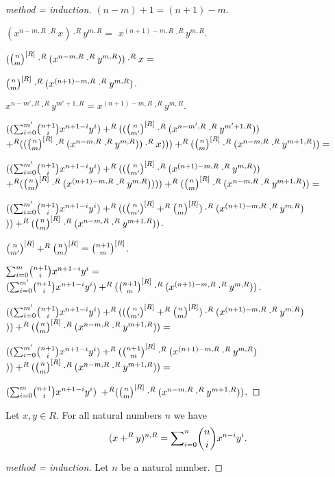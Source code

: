 \documentclass[11pt]{article}
\begin{document}
\begin{forthel}
\begin{proof}[method = induction]
$(n - m) + 1 = (n + 1) - m$.

$(x^{n - m,R} \cdot^{R} x) \cdot^{R} y^{m,R} =$
$x^{(n+1)-m,R} \cdot^{R} y^{m,R}$.

$(\cho{n}{m}^{[R]} \cdot^{R} (x^{n - m,R} \cdot^{R} y^{m,R})) \cdot^{R} x = $

$\cho{n}{m}^{[R]} \cdot^{R} (x^{(n+1) - m,R} \cdot^{R} y^{m,R})$.

$x^{n-m',R} \cdot^{R} y^{m'+1,R} = x^{(n+1)-m,R} \cdot^{R} y^{m,R}.$

$ ((\binsum{m'}{n+1}{x}{y}{R}) +^{R} ((\cho{n}{m'}^{[R]} \cdot^{R} (x^{n-m',R} \cdot^{R} y^{m'+1,R})) $
$ +^{R} 
((\cho{n}{m}^{[R]} \cdot^{R} (x^{n - m,R} \cdot^{R} y^{m,R})) \cdot^{R} x)))
   +^{R} (\cho{n}{m}^{[R]} \cdot^{R} (x^{n - m,R} \cdot^{R} y^{m+1,R})) = $

$ ((\binsum{m'}{n+1}{x}{y}{R}) +^{R} ((\cho{n}{m'}^{[R]} \cdot^{R} (x^{(n+1)-m,R} \cdot^{R} y^{m,R})) $
$ +^{R} 
(\cho{n}{m}^{[R]} \cdot^{R} (x^{(n+1) - m,R} \cdot^{R} y^{m,R}))))
   +^{R} (\cho{n}{m}^{[R]} \cdot^{R} (x^{n - m,R} \cdot^{R} y^{m+1,R})) =$

$ ((\binsum{m'}{n+1}{x}{y}{R}) +^{R} ((\cho{n}{m'}^{[R]} +^{R}  \cho{n}{m}^{[R]} )\cdot^{R} (x^{(n+1)-m,R} \cdot^{R} y^{m,R}) $
$  ))
   +^{R} (\cho{n}{m}^{[R]} \cdot^{R} (x^{n - m,R} \cdot^{R} y^{m+1,R})) $.

$\cho{n}{m'}^{[R]} +^{R}  \cho{n}{m}^{[R]} = \cho{n+1}{m}^{[R]}$.



$ \binsum{m}{n+1}{x}{y}{R} =$
$(\binsum{m'}{n+1}{x}{y}{R}) +^{R} (\cho{n+1}{m}^{[R]} \cdot^{R} (x^{(n+1)-m,R} \cdot^{R} y^{m,R}))$.



$ ((\binsum{m'}{n+1}{x}{y}{R}) +^{R} ((\cho{n}{m'}^{[R]} +^{R}  \cho{n}{m}^{[R]} )\cdot^{R} (x^{(n+1)-m,R} \cdot^{R} y^{m,R}) $
$  ))
   +^{R} (\cho{n}{m}^{[R]} \cdot^{R} (x^{n - m,R} \cdot^{R} y^{m+1,R})) =$


$ ((\binsum{m'}{n+1}{x}{y}{R}) +^{R} (\cho{n+1}{m}^{[R]} \cdot^{R} (x^{(n+1)-m,R} \cdot^{R} y^{m,R}) $
$  ))
   +^{R} (\cho{n}{m}^{[R]} \cdot^{R} (x^{n - m,R} \cdot^{R} y^{m+1,R})) =$

$ (\binsum{m}{n+1}{x}{y}{R}) $
$  +^{R} (\cho{n}{m}^{[R]} \cdot^{R} (x^{n - m,R} \cdot^{R} y^{m+1,R})) $.




\end{proof}

\begin{theorem}
Let $x,y \in R$. For all natural numbers $n$ we have
\[(x +^{R} y)^{n,R} = \binsum{n}{n}{x}{y}{R}.\]
\end{theorem}
\begin{proof}[method = induction]
Let $n$ be a natural number.


\end{proof}
\end{forthel}
\end{document}
